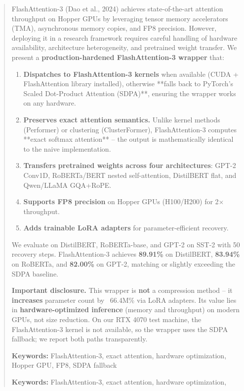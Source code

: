 \documentclass{article}
\begin{document}
\maketitle

\begin{abstract}
FlashAttention-3 (Dao et al., 2024) achieves state-of-the-art attention 
throughput on Hopper GPUs by leveraging tensor memory accelerators (TMA), 
asynchronous memory copies, and FP8 precision. However, deploying it in a 
research framework requires careful handling of hardware availability, 
architecture heterogeneity, and pretrained weight transfer. We present a 
\textbf{production-hardened FlashAttention-3 wrapper} that:

\begin{enumerate}
\item \textbf{Dispatches to FlashAttention-3 kernels} when available (CUDA + FlashAttention
  library installed), otherwise **falls back to PyTorch's Scaled Dot-Product
  Attention (SDPA)**, ensuring the wrapper works on any hardware.
\item \textbf{Preserves exact attention semantics.} Unlike kernel methods (Performer)
  or clustering (ClusterFormer), FlashAttention-3 computes **exact softmax
  attention** -- the output is mathematically identical to the naive implementation.
\item \textbf{Transfers pretrained weights across four architectures}: GPT-2 Conv1D,
  RoBERTa/BERT nested self-attention, DistilBERT flat, and Qwen/LLaMA
  GQA+RoPE.
\item \textbf{Supports FP8 precision} on Hopper GPUs (H100/H200) for 2$\times$ throughput.
\item \textbf{Adds trainable LoRA adapters} for parameter-efficient recovery.

\end{enumerate}
We evaluate on DistilBERT, RoBERTa-base, and GPT-2 on SST-2 with 
50 recovery steps. FlashAttention-3 achieves \textbf{89.91\%} 
on DistilBERT, \textbf{83.94\%} on RoBERTa, and \textbf{82.00\%} on GPT-2, 
matching or slightly exceeding the SDPA baseline.

\textbf{Important disclosure.} This wrapper is \textbf{not} a compression method -- it 
\textbf{increases} parameter count by ~66.4M\% via LoRA adapters. Its 
value lies in \textbf{hardware-optimized inference} (memory and throughput) on 
modern GPUs, not size reduction. On our RTX 4070 test machine, the 
FlashAttention-3 kernel is not available, so the wrapper uses the SDPA 
fallback; we report both paths transparently.

\textbf{Keywords:} FlashAttention-3, exact attention, hardware optimization, 
Hopper GPU, FP8, SDPA fallback



\vspace{0.5em}
\noindent\textbf{Keywords:} FlashAttention-3, exact attention, hardware optimization,
\end{abstract}
\end{document}
